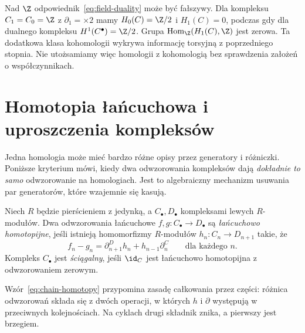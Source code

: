 \begin{uwaga}
Nad $\Z$ odpowiednik~\eqref{eq:field-duality}
może być fałszywy. Dla kompleksu
$C_1=C_0=\Z$ z $\partial_1=\times2$ mamy
$H_0(C)=\Z/2$ i $H_1(C)=0$,
podczas gdy dla dualnego kompleksu
$H^1(C^\bullet)=\Z/2$.
Grupa $\operatorname{Hom}_{\Z}
(H_1(C),\Z)$ jest zerowa.
Ta dodatkowa klasa kohomologii
wykrywa informację torsyjną z
poprzedniego stopnia. Nie utożsamiamy
więc homologii z kohomologią bez
sprawdzenia założeń o współczynnikach.
\end{uwaga}
\section{Homotopia łańcuchowa i uproszczenia kompleksów}
\label{sec:homotopia-lancuchowa}

Jedna homologia może mieć bardzo różne opisy
przez generatory i różniczki. Poniższe kryterium
mówi, kiedy dwa odwzorowania kompleksów dają
\emph{dokładnie to samo} odwzorowanie na
homologiach. Jest to algebraiczny mechanizm
usuwania par generatorów, które wzajemnie
się kasują.

\begin{definicja}
\label{def:homotopia-lancuchowa}
Niech $R$ będzie pierścieniem z jedynką,
a $C_\bullet,D_\bullet$ kompleksami lewych
$R$-modułów. Dwa odwzorowania łańcuchowe
$f,g:C_\bullet\to D_\bullet$
są \emph{łańcuchowo homotopijne}, jeśli istnieją
homomorfizmy $R$-modułów $h_n:C_n\to D_{n+1}$ takie, że
\begin{equation}\label{eq:chain-homotopy}
 f_n-g_n=\partial^D_{n+1}h_n+h_{n-1}\partial^C_n
 \qquad\text{dla każdego }n.
\end{equation}
Kompleks $C_\bullet$ jest \emph{ściągalny},
jeśli $\id_C$ jest łańcuchowo homotopijna
z odwzorowaniem zerowym.
\end{definicja}

Wzór~\eqref{eq:chain-homotopy} przypomina
zasadę całkowania przez części: różnica
odwzorowań składa się z dwóch operacji, w których
$h$ i $\partial$ występują w przeciwnych
kolejnościach. Na cyklach drugi składnik
znika, a pierwszy jest brzegiem.

